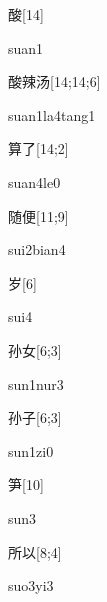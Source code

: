 \begin{verbete}[suan1]{酸}[14]
\begin{pronuncia}{suan1}
\end{pronuncia}
\end{verbete}

\begin{verbete}{酸辣汤}[14;14;6]
\begin{pronuncia}{suan1la4tang1}
\end{pronuncia}
\end{verbete}

\begin{verbete}[suan4le0]{算了}[14;2]
\begin{pronuncia}{suan4le0}
\end{pronuncia}
\end{verbete}

\begin{verbete}{随便}[11;9]
\begin{pronuncia}{sui2bian4}
\end{pronuncia}
\end{verbete}

\begin{verbete}[sui4]{岁}[6]
\begin{pronuncia}{sui4}
\end{pronuncia}
\end{verbete}

\begin{verbete}{孙女}[6;3]
\begin{pronuncia}{sun1nur3}
\end{pronuncia}
\end{verbete}

\begin{verbete}[sun1zi0]{孙子}[6;3]
\begin{pronuncia}{sun1zi0}
\end{pronuncia}
\end{verbete}

\begin{verbete}[sun3]{笋}[10]
\begin{pronuncia}{sun3}
\end{pronuncia}
\end{verbete}

\begin{verbete}[suo3yi3]{所以}[8;4]
\begin{pronuncia}{suo3yi3}
\end{pronuncia}
\end{verbete}

